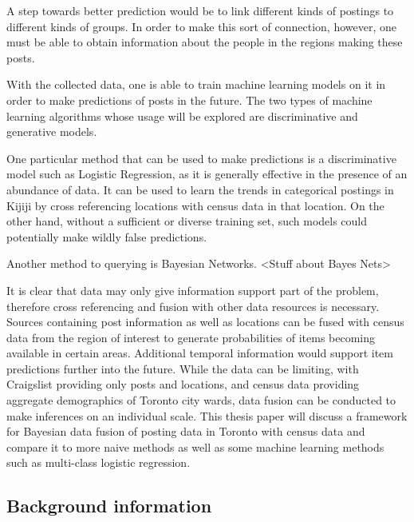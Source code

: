 \documentclass[12pt]{article}
\begin{document}
A step towards better prediction would be to link different kinds of postings to different kinds of groups. In order to make this sort of connection, however, one must be able to obtain information about the people in the regions making these posts. 


With the collected data, one is able to train machine learning models on it in order to make predictions of posts in the future. 
The two types of machine learning algorithms whose usage will be explored are discriminative and generative models. 

One particular method that can be used to make predictions is a discriminative model such as Logistic Regression, as it is generally effective in the presence of an abundance of data. It can be used to learn the trends in categorical postings in Kijiji by cross referencing locations with census data in that location. On the other hand, without a sufficient or diverse training set, such models could potentially make wildly false predictions.

Another method  to querying is Bayesian Networks. <Stuff about Bayes Nets>

It is clear that data may only give information support part of the problem, therefore cross referencing and fusion with other data resources is necessary. Sources containing post information as well as locations can be fused with census data from the region of interest to generate probabilities of items becoming available in certain areas. Additional temporal information would support item predictions further into the future. While the data can be limiting, with Craigslist providing only posts and locations, and census data providing aggregate demographics of Toronto city wards, data fusion can be conducted to make inferences on an individual scale. This thesis paper will discuss a framework for Bayesian data fusion of posting data in Toronto with census data and compare it to more naive methods as well as some machine learning methods such as multi-class logistic regression. 




\subsection{Background information}
\end{document}
